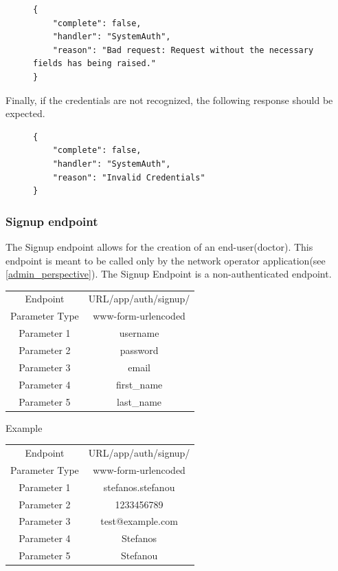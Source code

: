 					\begin{figure}[H]
						\iftrue
						\begin{lstlisting}[]
{
	"complete": false,
	"handler": "SystemAuth",
	"reason": "Bad request: Request without the necessary fields has being raised."
}
						\end{lstlisting}
					\end{figure}
					Finally, if the credentials are not recognized, the following response should be expected.
										\begin{figure}[H]
						\iftrue
						\begin{lstlisting}[]
{
	"complete": false,
	"handler": "SystemAuth",
	"reason": "Invalid Credentials"
}
						\end{lstlisting}
					\end{figure}
				\subsubsection{Signup endpoint}				
					The Signup endpoint allows for the creation of an end-user(doctor). This endpoint is meant to be 
					called only by the network operator application(see \ref{admin_perspective}). The Signup Endpoint 
					is a non-authenticated endpoint.
					\begin{center}
						\begin{tabular}{ |c|c| } 
							\hline
							Endpoint & {{URL}}/app/auth/signup/\\
							Parameter Type & www-form-urlencoded  \\
							Parameter 1 & username\\
							Parameter 2 & password  \\
							Parameter 3 & email  \\
							Parameter 4 & first\_name \\
							Parameter 5 & last\_name  \\
							\hline
						\end{tabular}
					\end{center}
					Example
					\begin{center}
						\begin{tabular}{ |c|c| } 
							\hline
							Endpoint & {{URL}}/app/auth/signup/\\
							Parameter Type & www-form-urlencoded  \\
							Parameter 1 & stefanos.stefanou\\
							Parameter 2 & 1233456789  \\
							Parameter 3 & test@example.com  \\
							Parameter 4 & Stefanos \\
							Parameter 5 & Stefanou  \\
							\hline
						\end{tabular}
					\end{center}

